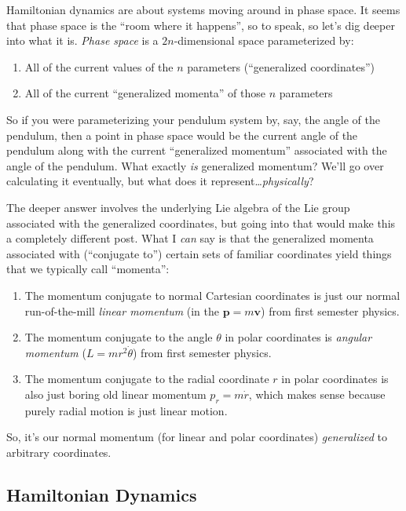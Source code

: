 \documentclass[]{article}
\begin{document}
Hamiltonian dynamics are about systems moving around in phase space. It seems
that phase space is the ``room where it happens'', so to speak, so let's dig
deeper into what it is. \emph{Phase space} is a \(2n\)-dimensional space
parameterized by:

\begin{enumerate}
\def\labelenumi{\arabic{enumi}.}
\tightlist
\item
  All of the current values of the \(n\) parameters (``generalized
  coordinates'')
\item
  All of the current ``generalized momenta'' of those \(n\) parameters
\end{enumerate}

So if you were parameterizing your pendulum system by, say, the angle of the
pendulum, then a point in phase space would be the current angle of the pendulum
along with the current ``generalized momentum'' associated with the angle of the
pendulum. What exactly \emph{is} generalized momentum? We'll go over calculating
it eventually, but what does it represent\ldots{}\emph{physically}?

The deeper answer involves the underlying Lie algebra of the Lie group
associated with the generalized coordinates, but going into that would make this
a completely different post. What I \emph{can} say is that the generalized
momenta associated with (``conjugate to'') certain sets of familiar coordinates
yield things that we typically call ``momenta'':

\begin{enumerate}
\def\labelenumi{\arabic{enumi}.}
\item
  The momentum conjugate to normal Cartesian coordinates is just our normal
  run-of-the-mill \emph{linear momentum} (in the \(\mathbf{p} = m \mathbf{v}\))
  from first semester physics.
\item
  The momentum conjugate to the angle \(\theta\) in polar coordinates is
  \emph{angular momentum} (\(L = m r^2 \dot{\theta}\)) from first semester
  physics.
\item
  The momentum conjugate to the radial coordinate \(r\) in polar coordinates is
  also just boring old linear momentum \(p_r = m \dot{r}\), which makes sense
  because purely radial motion is just linear motion.
\end{enumerate}

So, it's our normal momentum (for linear and polar coordinates)
\emph{generalized} to arbitrary coordinates.

\subsection{Hamiltonian Dynamics}\label{hamiltonian-dynamics}
\end{document}

